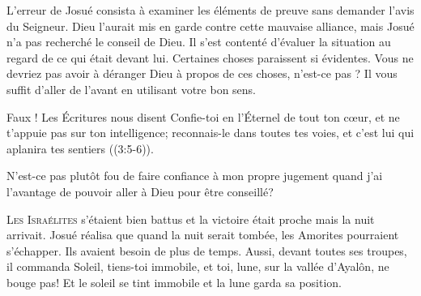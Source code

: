L'erreur de Josué consista à examiner les éléments de preuve
 sans demander l'avis du Seigneur.
 Dieu l'aurait mis en garde contre cette mauvaise alliance,
 mais Josué n'a pas recherché le conseil de Dieu.
 Il s'est contenté d'évaluer la situation au regard de ce qui était devant lui.
 Certaines choses paraissent si évidentes.
 Vous ne devriez pas avoir à déranger Dieu à propos de ces choses,
 n'est-ce pas ? 
 Il vous suffit d'aller de l'avant en utilisant votre bon sens.

Faux ! Les Écritures nous disent\frcolon
 \Og Confie-toi en l'Éternel de tout ton c\oe{}ur,
 et ne t'appuie pas sur ton intelligence;
 reconnais-le dans toutes tes voies,
 et c'est lui qui aplanira tes sentiers \Fg{} ((3:5-6)).


N'est-ce pas plutôt fou de faire confiance à mon propre jugement
 quand j'ai l'avantage de pouvoir aller à Dieu pour être conseillé? 

\dvrule






\lettrine{L}{es Israélites} s'étaient bien battus
 et la victoire était proche \ocadr mais la nuit arrivait.
 Josué réalisa que quand la nuit serait tombée,
 les Amorites pourraient s'échapper. Ils avaient besoin de plus de temps.
 Aussi, devant toutes ses troupes, il commanda\frcolon
 \Og Soleil, tiens-toi immobile, et toi, lune, sur la vallée d'Ayalôn,
 ne bouge pas! \Fg{}
 Et le soleil se tint immobile et la lune garda sa position.


